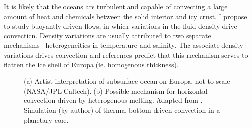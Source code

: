 \documentclass[12pt]{article}
\begin{document}

It is likely that the oceans are turbulent and capable of convecting a large amount of heat and chemicals between the solid interior and icy crust.
I propose to study buoyantly driven flows, in which variations in the fluid density drive convection.
Density variations are usually attributed to two separate mechanisms-- heterogeneities in temperature and salinity. The associate density variations drives convection and references \citep{yA21,wK22} predict that this mechanism serves to flatten the ice shell of Europa (ie.  homogenous thickness).
\begin{figure}[H]
	\begin{center}
		\quad
	\end{center}
	\caption{(a) Artist interpretation of subsurface ocean on Europa, not to scale (NASA/JPL-Caltech). (b) Possible mechanism for horizontal convection driven by heterogenous melting. Adapted from \citep{wK22}. Simulation (by author) of thermal bottom driven convection in a planetary core\citep{tO25}.}
	\label{f:pic}
\end{figure}
\end{document}
